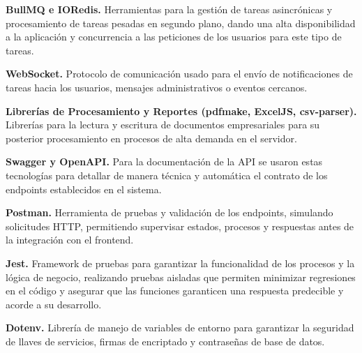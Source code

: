 \textbf{BullMQ e IORedis.} Herramientas para la gestión de tareas asincrónicas y procesamiento de tareas pesadas en segundo plano, dando una alta disponibilidad a la aplicación y concurrencia a las peticiones de los usuarios para este tipo de tareas. \par

\textbf{WebSocket.} Protocolo de comunicación usado para el envío de notificaciones de tareas hacia los usuarios, mensajes administrativos o eventos cercanos. \par

\textbf{Librerías de Procesamiento y Reportes (pdfmake, ExcelJS, csv-parser).} Librerías para la lectura y escritura de documentos empresariales para su posterior procesamiento en procesos de alta demanda en el servidor. \par

\textbf{Swagger y OpenAPI.} Para la documentación de la API se usaron estas tecnologías para detallar de manera técnica y automática el contrato de los endpoints establecidos en el sistema. \par

\textbf{Postman.} Herramienta de pruebas y validación de los endpoints, simulando solicitudes HTTP, permitiendo supervisar estados, procesos y respuestas antes de la integración con el frontend. \par

\textbf{Jest.} Framework de pruebas para garantizar la funcionalidad de los procesos y la lógica de negocio, realizando pruebas aisladas que permiten minimizar regresiones en el código y asegurar que las funciones garanticen una respuesta predecible y acorde a su desarrollo. \par

\textbf{Dotenv.} Librería de manejo de variables de entorno para garantizar la seguridad de llaves de servicios, firmas de encriptado y contraseñas de base de datos.

